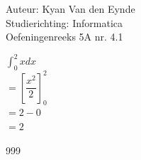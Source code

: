 \documentclass[a4paper]{article}
\begin{document}
  
\noindent \large Auteur: Kyan Van den Eynde \\
\noindent \large Studierichting: Informatica\\
\noindent \large Oefeningenreeks 5A nr. 4.1\\

\medskip

\normalsize

$\displaystyle\int^2_0 x dx$\\

$= \left[\dfrac{x^2}{2}\right]^2_0$\\

$= 2 - 0$\\

$= 2$\\

\begin{thebibliography}{999}
\end{thebibliography}
\end{document}
